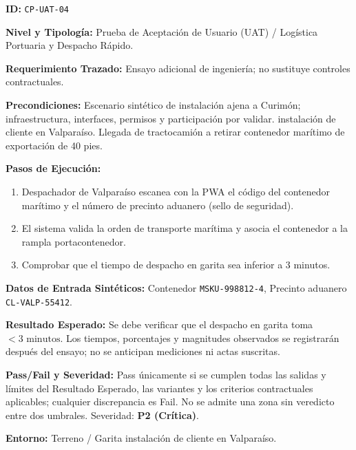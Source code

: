 \par\noindent\textbf{ID:} \texttt{C\allowbreak{}P\allowbreak{}-\allowbreak{}U\allowbreak{}A\allowbreak{}T\allowbreak{}-\allowbreak{}0\allowbreak{}4\allowbreak{}}\par
\par\noindent\textbf{Nivel y Tipología:} Prueba de Aceptación de Usuario (UAT) / Logística Portuaria y Despacho Rápido.\par
\par\noindent\textbf{Requerimiento Trazado:} Ensayo adicional de ingeniería; no sustituye controles contractuales.\par
\par\noindent\textbf{Precondiciones:} Escenario sintético de instalación ajena a Curimón; infraestructura, interfaces, permisos y participación por validar.  instalación de cliente en Valparaíso. Llegada de tractocamión a retirar contenedor marítimo de exportación de 40 pies.\par
\par\noindent\textbf{Pasos de Ejecución:} \par
\begin{enumerate}
\item Despachador de Valparaíso escanea con la PWA el código del contenedor marítimo y el número de precinto aduanero (sello de seguridad).
\item El sistema valida la orden de transporte marítima y asocia el contenedor a la rampla portacontenedor.
\item Comprobar que el tiempo de despacho en garita sea inferior a 3 minutos.
\end{enumerate}
\par\noindent\textbf{Datos de Entrada Sintéticos:} Contenedor \texttt{M\allowbreak{}S\allowbreak{}K\allowbreak{}U\allowbreak{}-\allowbreak{}9\allowbreak{}9\allowbreak{}8\allowbreak{}8\allowbreak{}1\allowbreak{}2\allowbreak{}-\allowbreak{}4\allowbreak{}}, Precinto aduanero \texttt{C\allowbreak{}L\allowbreak{}-\allowbreak{}V\allowbreak{}A\allowbreak{}L\allowbreak{}P\allowbreak{}-\allowbreak{}5\allowbreak{}5\allowbreak{}4\allowbreak{}1\allowbreak{}2\allowbreak{}}.\par
\par\noindent\textbf{Resultado Esperado:} Se debe verificar que el despacho en garita toma \(< 3\text{ minutos}\). Los tiempos, porcentajes y magnitudes observados se registrarán después del ensayo; no se anticipan mediciones ni actas suscritas.\par
\par\noindent\textbf{Pass/Fail y Severidad:} Pass únicamente si se cumplen todas las salidas y límites del Resultado Esperado, las variantes y los criterios contractuales aplicables; cualquier discrepancia es Fail. No se admite una zona sin veredicto entre dos umbrales. Severidad: \textbf{P2 (Crítica)}.\par
\par\noindent\textbf{Entorno:} Terreno / Garita instalación de cliente en Valparaíso.\par






